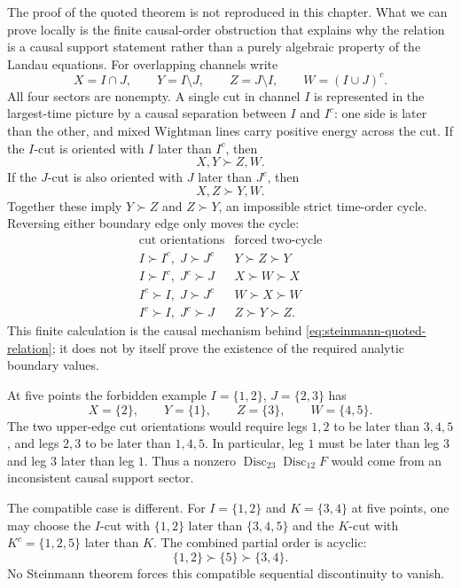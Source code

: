 The proof of the quoted theorem is not reproduced in this chapter.  What we
can prove locally is the finite causal-order obstruction that explains why the
relation is a causal support statement rather than a purely algebraic property
of the Landau equations.  For overlapping channels write
\begin{equation}
  X=I\cap J,\qquad
  Y=I\setminus J,\qquad
  Z=J\setminus I,\qquad
  W=(I\cup J)^c .
  \label{eq:steinmann-overlap-four-sector-decomposition}
\end{equation}
All four sectors are nonempty.  A single cut in channel \(I\) is represented in
the largest-time picture by a causal separation between \(I\) and \(I^c\): one
side is later than the other, and mixed Wightman lines carry positive energy
across the cut.  If the \(I\)-cut is oriented with \(I\) later than \(I^c\),
then
\[
  X,Y \succ Z,W .
\]
If the \(J\)-cut is also oriented with \(J\) later than \(J^c\), then
\[
  X,Z \succ Y,W .
\]
Together these imply \(Y\succ Z\) and \(Z\succ Y\), an impossible strict
time-order cycle.  Reversing either boundary edge only moves the cycle:
\[
\begin{array}{c|c}
  \text{cut orientations} & \text{forced two-cycle}\\ \hline
  I\succ I^c,\; J\succ J^c & Y\succ Z\succ Y\\
  I\succ I^c,\; J^c\succ J & X\succ W\succ X\\
  I^c\succ I,\; J\succ J^c & W\succ X\succ W\\
  I^c\succ I,\; J^c\succ J & Z\succ Y\succ Z .
\end{array}
\]
This finite calculation is the causal mechanism behind
\eqref{eq:steinmann-quoted-relation}; it does not by itself prove the existence
of the required analytic boundary values.

At five points the forbidden example \(I=\{1,2\}\), \(J=\{2,3\}\) has
\[
  X=\{2\},\qquad Y=\{1\},\qquad Z=\{3\},\qquad W=\{4,5\}.
\]
The two upper-edge cut orientations would require legs \(1,2\) to be later
than \(3,4,5\), and legs \(2,3\) to be later than \(1,4,5\).  In particular,
leg \(1\) must be later than leg \(3\) and leg \(3\) later than leg \(1\).
Thus a nonzero \(\operatorname{Disc}_{23}\operatorname{Disc}_{12}F\) would
come from an inconsistent causal support sector.

The compatible case is different.  For \(I=\{1,2\}\) and \(K=\{3,4\}\) at five
points, one may choose the \(I\)-cut with \(\{1,2\}\) later than
\(\{3,4,5\}\) and the \(K\)-cut with \(K^c=\{1,2,5\}\) later than \(K\).
The combined partial order is acyclic:
\[
  \{1,2\}\succ\{5\}\succ\{3,4\}.
\]
No Steinmann theorem forces this compatible sequential discontinuity to vanish.

